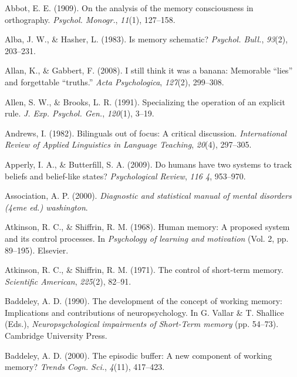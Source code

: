 \documentclass[
]{krantz}
\newlength{\cslhangindent}
\newenvironment{CSLReferences}[2] %
 {\begin{list}{}{%
  \setlength{\itemindent}{0pt}
  \setlength{\leftmargin}{0pt}
  \setlength{\parsep}{0pt}
  \ifodd #1
   \setlength{\leftmargin}{\cslhangindent}
   \setlength{\itemindent}{-1\cslhangindent}
  \fi
  \setlength{\itemsep}{#2\baselineskip}}}
 {\end{list}}
\begin{document}
\label{refs}
\begin{CSLReferences}{1}{0}
Abbot, E. E. (1909). On the analysis of the memory consciousness in orthography. \emph{Psychol. Monogr.}, \emph{11}(1), 127--158.

Alba, J. W., \& Hasher, L. (1983). Is memory schematic? \emph{Psychol. Bull.}, \emph{93}(2), 203--231.

Allan, K., \& Gabbert, F. (2008). I still think it was a banana: Memorable {``lies''} and forgettable {``truths.''} \emph{Acta Psychologica}, \emph{127}(2), 299--308.

Allen, S. W., \& Brooks, L. R. (1991). Specializing the operation of an explicit rule. \emph{J. Exp. Psychol. Gen.}, \emph{120}(1), 3--19.

Andrews, I. (1982). Bilinguals out of focus: A critical discussion. \emph{International Review of Applied Linguistics in Language Teaching}, \emph{20}(4), 297--305.

Apperly, I. A., \& Butterfill, S. A. (2009). Do humans have two systems to track beliefs and belief-like states? \emph{Psychological Review}, \emph{116 4}, 953--970.

Association, A. P. (2000). \emph{Diagnostic and statistical manual of mental disorders (4eme ed.) washington}.

Atkinson, R. C., \& Shiffrin, R. M. (1968). Human memory: A proposed system and its control processes. In \emph{Psychology of learning and motivation} (Vol. 2, pp. 89--195). Elsevier.

Atkinson, R. C., \& Shiffrin, R. M. (1971). The control of short-term memory. \emph{Scientific American}, \emph{225}(2), 82--91.

Baddeley, A. D. (1990). The development of the concept of working memory: Implications and contributions of neuropsychology. In G. Vallar \& T. Shallice (Eds.), \emph{Neuropsychological impairments of {Short-Term} memory} (pp. 54--73). Cambridge University Press.

Baddeley, A. D. (2000). The episodic buffer: A new component of working memory? \emph{Trends Cogn. Sci.}, \emph{4}(11), 417--423.


\end{CSLReferences}
\end{document}
